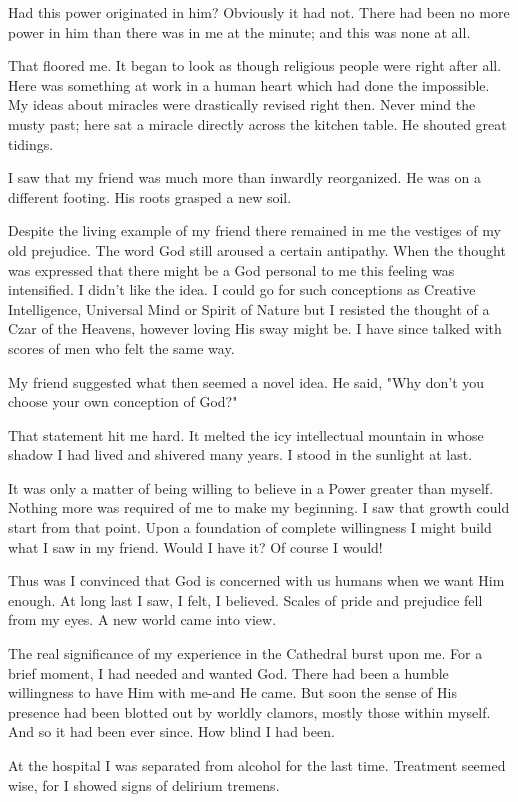 \begin{biblechapter}
\verse Had this power originated in him?
\verse Obviously it had not.
\verse There had been no more power in him than there was in me at the minute; 
    and this was none at all.

\verse That floored me.
\verse It began to look as though religious people were right after all.
\verse Here was something at work in a human heart which had done the impossible.
\verse My ideas about miracles were drastically revised right then.
\verse Never mind the musty past; 
    here sat a miracle directly across the kitchen table.
\verse He shouted great tidings.

\verse I saw that my friend was much more than inwardly reorganized.
\verse He was on a different footing.
\verse His roots grasped a new soil.

\verse Despite the living example of my friend 
    there remained in me the vestiges of my old prejudice.
\verse The word God still aroused a certain antipathy.
\verse When the thought was expressed that there might be a God personal to me 
    this feeling was intensified.
\verse I didn't like the idea.
\verse I could go for such conceptions as Creative Intelligence, 
    Universal Mind or Spirit of Nature 
    but I resisted the thought of a Czar of the Heavens, 
    however loving His sway might be.
\verse I have since talked with scores of men who felt the same way.
\end{biblechapter}


\begin{biblechapter}
    My friend suggested what then seemed a novel idea.  
\verse He said, "Why don't you choose your own conception of God?"

\verse That statement hit me hard.
\verse It melted the icy intellectual mountain 
    in whose shadow I had lived and shivered many years.
\verse I stood in the sunlight at last.

\verse It was only a matter of being willing 
    to believe in a Power greater than myself.
\verse Nothing more was required of me to make my beginning.
\verse I saw that growth could start from that point.
\verse Upon a foundation of complete willingness 
    I might build what I saw in my friend.
\verse Would I have it?
\verse Of course I would!

\verse Thus was I convinced that God is concerned with us humans 
    when we want Him enough.
\verse At long last I saw, I felt, I believed.
\verse Scales of pride and prejudice fell from my eyes.
\verse A new world came into view.

\verse The real significance of my experience in the Cathedral burst upon me.
\verse For a brief moment, I had needed and wanted God.
\verse There had been a humble willingness to have Him with me-and He came.
\verse But soon the sense of His presence had been blotted out by worldly clamors, 
    mostly those within myself.
\verse And so it had been ever since.
\verse How blind I had been.

\verse At the hospital I was separated from alcohol for the last time.
\verse Treatment seemed wise, for I showed signs of delirium tremens.
\end{biblechapter}


